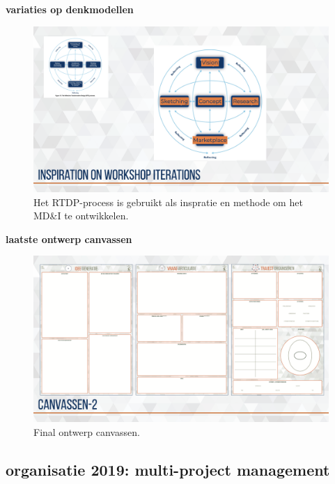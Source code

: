 \documentclass[
]{book}
\begin{document}
\textbf{variaties op denkmodellen}

\begin{figure}

{\centering \includegraphics[width=26.67in]{data/keynote-slides/20200430-CDE-Designprocess/20200430-CDE-Designprocess.024-1} 

}

\caption{Het RTDP-process is gebruikt als inspratie en methode om het MD\&I te ontwikkelen.}\label{fig:unnamed-chunk-20}
\end{figure}

\textbf{laatste ontwerp canvassen}

\begin{figure}

{\centering \includegraphics[width=0.5\linewidth]{data/keynote-slides/20200430-CDE-Designprocess/20200430-CDE-Designprocess.025} 

}

\caption{Final ontwerp canvassen.}\label{fig:unnamed-chunk-21}
\end{figure}

\hypertarget{organisatie-2019-multi-project-management}{%
\subsection{organisatie 2019: multi-project management}\label{organisatie-2019-multi-project-management}}
\end{document}

